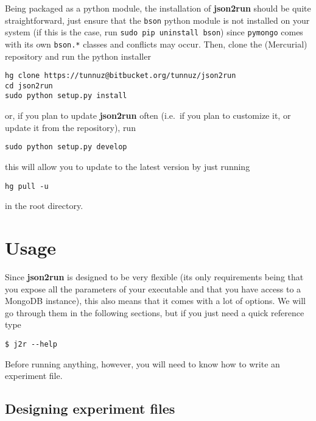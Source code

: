 \documentclass[11pt,notitlepage,twoside,a4paper]{article}
\begin{document}
Being packaged as a python module, the installation of \textbf{json2run}
should be quite straightforward, just ensure that the \texttt{bson}
python module is not installed on your system (if this is the case, run
\texttt{sudo pip uninstall bson}) since \texttt{pymongo} comes with its
own \texttt{bson.*} classes and conflicts may occur. Then, clone the
(Mercurial) repository and run the python installer

\begin{small}
\begin{lstlisting}
hg clone https://tunnuz@bitbucket.org/tunnuz/json2run
cd json2run
sudo python setup.py install
\end{lstlisting}
\end{small}

\noindent
or, if you plan to update \textbf{json2run} often (i.e.~if you plan to
customize it, or update it from the repository), run

\begin{lstlisting}
sudo python setup.py develop
\end{lstlisting}

\noindent
this will allow you to update to the latest version by just running

\begin{lstlisting}
hg pull -u
\end{lstlisting}

\noindent
in the root directory.

\section{Usage}

Since \textbf{json2run} is designed to be very flexible (its only
requirements being that you expose all the parameters of your executable
and that you have access to a MongoDB instance), this also means that it
comes with a lot of options. We will go through them in the following
sections, but if you just need a quick reference type

\begin{lstlisting}
$ j2r --help
\end{lstlisting}

Before running anything, however, you will need to know how to write an
experiment file.

\subsection{Designing experiment files}
\end{document}
